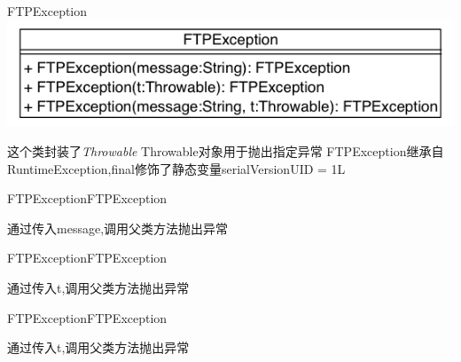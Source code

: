 \begin{XeClass}{FTPException}
\includegraphics[width=\textwidth]{cdig/FTPException.png}
     
 这个类封装了\emph{Throwable} Throwable对象用于抛出指定异常
 FTPException继承自RuntimeException,final修饰了静态变量serialVersionUID = 1L

    \begin{XeMethod}{\XePublic}{FTPException}{FTPException}
         
 通过传入message,调用父类方法抛出异常

    \end{XeMethod}

    \begin{XeMethod}{\XePublic}{FTPException}{FTPException}
         
 通过传入t,调用父类方法抛出异常

    \end{XeMethod}

    \begin{XeMethod}{\XePublic}{FTPException}{FTPException}
         
 通过传入t,调用父类方法抛出异常

    \end{XeMethod}

\end{XeClass}
